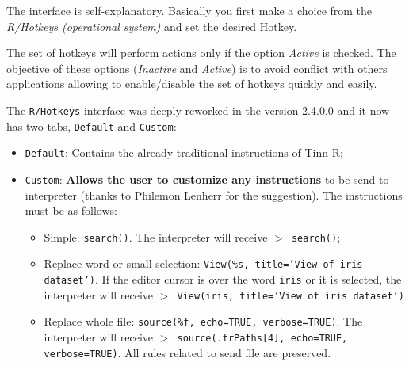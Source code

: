 The interface is self-explanatory. Basically you first make a choice from
the \textit{R/Hotkeys (operational system)} and set the desired Hotkey.

The set of hotkeys will perform actions only if the option \textit{Active}
is checked. The objective of these options (\textit{Inactive} and
\textit{Active}) is to avoid conflict with others applications allowing
to enable/disable the set of hotkeys quickly and easily.

The \texttt{R/Hotkeys} interface was deeply reworked in the version 2.4.0.0 and it now has two tabs,
\texttt{Default} and \texttt{Custom}:

\begin{itemize}
\item \texttt{Default}: Contains the already traditional instructions of Tinn-R;
\item \texttt{Custom}: \textbf{Allows the user to customize any instructions} to be send to \RR{} interpreter (thanks to Philemon Lenherr for the suggestion). The instructions must be as follows:
 \begin{itemize}
 \item Simple: \texttt{search()}. The \RR{} interpreter will receive \texttt{$>$ search()};
 \item Replace word or small selection: \texttt{View(\%s, title='View of iris dataset')}.
   If the editor cursor is over the word \texttt{iris} or it is selected,
   the \RR{} interpreter will receive \texttt{$>$ View(iris, title='View of iris dataset')}
 \item Replace whole file: \texttt{source(\%f, echo=TRUE, verbose=TRUE)}.
   The \RR{} interpreter will receive \texttt{$>$ source(.trPaths[4], echo=TRUE, verbose=TRUE)}.
   All rules related to send file are preserved.
 \end{itemize}
\end{itemize}

